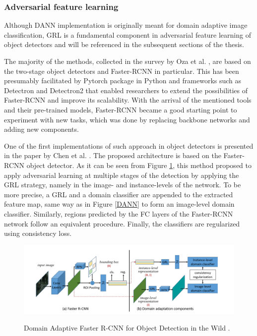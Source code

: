 \subsubsection{Adversarial feature learning}
\label{adv_approach} 

Although DANN implementation is originally meant for domain adaptive image classification, GRL is a fundamental component in adversarial feature learning of object detectors and will be referenced in the subsequent sections of the thesis. 

The majority of the methods, collected in the survey by Oza et al. \cite{Oza2021}, are based on the two-stage object detectors and Faster-RCNN \cite{ima} in particular. This has been presumably facilitated by Pytorch \cite{NEURIPS2019_9015} package in Python and frameworks such as Detectron \cite{Detectron2018} and Detectron2 \cite{wu2019Detectron2} that enabled researchers to extend the possibilities of Faster-RCNN and improve its scalability. With the arrival of the mentioned tools and their pre-trained models, Faster-RCNN became a good starting point to experiment with new tasks, which was done by replacing backbone networks and adding new components. 

One of the first implementations of such approach in object detectors is presented in the paper by Chen et al. \cite{Chen2018}. The proposed architecture is based on the Faster-RCNN object detector. As it can be seen from Figure \ref{Faster_rcnn_DA}, this method proposed to apply adversarial learning at multiple stages of the detection by applying the GRL strategy, namely in the image- and instance-levels of the network. To be more precise, a GRL and a domain classifier are appended to the extracted feature map, same way as in Figure \ref{DANN} to form an image-level domain classifier. Similarly, regions predicted by the FC layers of the Faster-RCNN network follow an equivalent procedure. Finally, the classifiers are regularized using consistency loss.   

\begin{figure}[htb]
	\begin{center}
		\includegraphics[width=16cm]{./faster_rcnn_DA.png}
	\end{center}
	\caption{Domain Adaptive Faster R-CNN for Object Detection in the Wild \cite{Chen2018}.}
	\begin{center}
		\label{Faster_rcnn_DA}
	\end{center}
\end{figure}
\FloatBarrier

